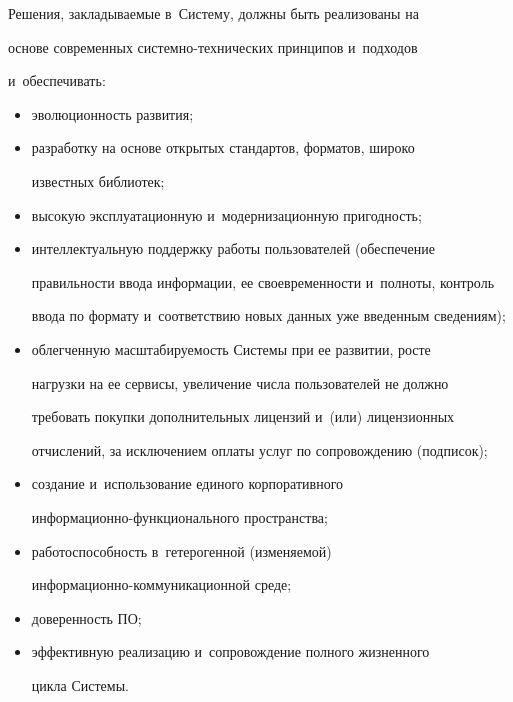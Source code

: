      


     Решения, закладываемые в~Систему, должны быть реализованы на 


основе современных системно-технических принципов и~подходов 


и~обеспечивать:


     \begin{itemize}


     \item эволюционность развития;


     \item разработку на основе открытых стандартов, форматов, широко 


известных библиотек;


     \item высокую эксплуатационную и~модернизационную пригодность;


     \item интеллектуальную поддержку работы пользователей (обеспечение 


правильности ввода информации, ее своевременности и~полноты, контроль 


ввода по формату и~соответствию новых данных уже введенным сведениям);


     \item облегченную масштабируемость Системы при ее развитии, росте 


нагрузки на ее сервисы, увеличение числа пользователей не должно 


требовать покупки дополнительных лицензий и~(или) лицензионных 


отчислений, за исключением оплаты услуг по сопровождению (подписок);


     \item создание и~использование единого корпоративного 


ин\-фор\-ма\-ци\-он\-но-функ\-ци\-о\-наль\-но\-го пространства;


     \item работоспособность в~гетерогенной (изменяемой) 


     ин\-фор\-ма\-ци\-он\-но-ком\-му\-ни\-ка\-ци\-он\-ной среде;


     \item доверенность ПО;


     \item эффективную реализацию и~сопровождение полного жизненного 


цикла Сис\-темы.


     \end{itemize}


